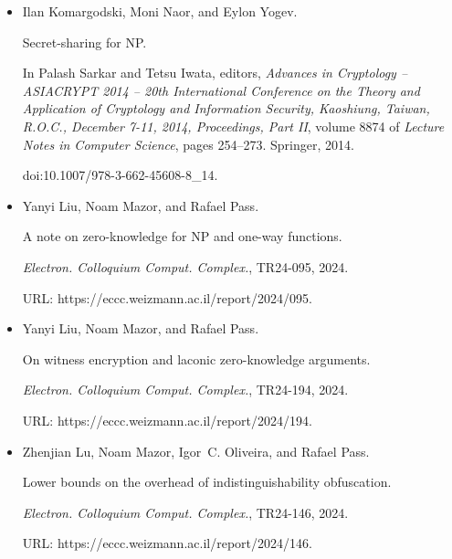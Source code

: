\begin{itemize}
doi:10.1109/FOCS.2014.47.





\item[] 
[34]

Ilan Komargodski, Moni Naor, and Eylon Yogev.


Secret-sharing for NP.


In Palash Sarkar and Tetsu Iwata, editors, \emph{Advances in
Cryptology – ASIACRYPT 2014 – 20th International Conference on the Theory
and Application of Cryptology and Information Security, Kaoshiung, Taiwan,
R.O.C., December 7-11, 2014, Proceedings, Part II}, volume 8874 of \emph{Lecture Notes in Computer Science}, pages 254–273. Springer, 2014.


doi:10.1007/978-3-662-45608-8\_14.





\item[] 
[35]

Yanyi Liu, Noam Mazor, and Rafael Pass.


A note on zero-knowledge for NP and one-way functions.


\emph{Electron. Colloquium Comput. Complex.}, TR24-095, 2024.


URL: https://eccc.weizmann.ac.il/report/2024/095.





\item[] 
[36]

Yanyi Liu, Noam Mazor, and Rafael Pass.


On witness encryption and laconic zero-knowledge arguments.


\emph{Electron. Colloquium Comput. Complex.}, TR24-194, 2024.


URL: https://eccc.weizmann.ac.il/report/2024/194.





\item[] 
[37]

Zhenjian Lu, Noam Mazor, Igor C. Oliveira, and Rafael Pass.


Lower bounds on the overhead of indistinguishability obfuscation.


\emph{Electron. Colloquium Comput. Complex.}, TR24-146, 2024.


URL: https://eccc.weizmann.ac.il/report/2024/146.






\end{itemize}
